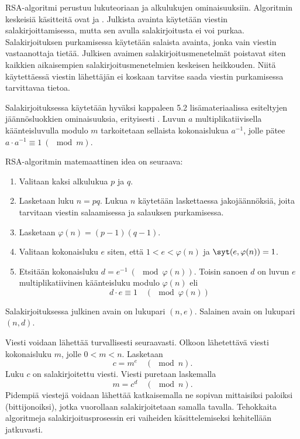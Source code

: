 RSA-algoritmi perustuu lukuteoriaan ja alkulukujen ominaisuuksiin. Algoritmin keskeisiä käsitteitä ovat  ja . Julkista avainta käytetään viestin salakirjoittamisessa, mutta sen avulla salakirjoitusta ei voi purkaa. Salakirjoituksen purkamisessa käytetään salaista avainta, jonka vain viestin vastaanottaja tietää. Julkisen avaimen salakirjoitusmenetelmät poistavat siten kaikkien aikaisempien salakirjoitusmenetelmien keskeisen heikkouden. Niitä käytettäessä viestin lähettäjän ei koskaan tarvitse saada viestin purkamisessa tarvittavaa tietoa. 

Salakirjoituksessa käytetään hyväksi kappaleen 5.2 lisämateriaalissa esiteltyjen jään\-nös\-luok\-kien ominaisuuksia, erityisesti . Luvun $a$ multiplikatiivisella käänteisluvulla modulo $m$ tarkoitetaan sellaista kokonaislukua $a^{-1}$, jolle pätee $a\cdot a^{-1} \equiv 1 \ (\mod m)$.

RSA-algoritmin matemaattinen idea on seuraava:
\begin{enumerate}
\item Valitaan kaksi alkulukua $p$ ja $q$.
\item Lasketaan luku $n=pq$. Lukua $n$ käytetään laskettaessa jakojäännöksiä, joita tarvitaan viestin salaamisessa ja salauksen purkamisessa.
\item Lasketaan $\varphi(n)=(p-1)(q-1)$. 
\item Valitaan kokonaisluku $e$ siten, että $1<e<\varphi(n)$ ja $\syt(e,\varphi(n))=1$.
\item Etsitään kokonaisluku $d = e^{-1}\ (\mod \varphi(n))$. Toisin sanoen $d$ on luvun $e$  multiplikatiivinen käänteisluku modulo $\varphi(n)$ eli
\[
d\cdot e \equiv 1\quad (\mod\varphi(n)) %
\]
\end{enumerate}
Salakirjoituksessa julkinen avain on lukupari $(n,e)$. Salainen avain on lukupari $(n,d)$. 

Viesti voidaan lähettää turvallisesti seuraavasti. Olkoon lähetettävä viesti kokonaisluku $m$, jolle $0<m<n$. Lasketaan
\[
c= m^e\quad (\mod n).
\]
Luku $c$ on salakirjoitettu viesti. Viesti puretaan laskemalla
\[
m=c^d\quad (\mod n).
\]
Pidempiä viestejä voidaan lähettää katkaisemalla ne sopivan mittaisiksi paloiksi (bittijonoiksi), jotka vuorollaan salakirjoitetaan samalla tavalla. Tehokkaita algoritmeja salakirjoitusprosessin eri vaiheiden käsittelemiseksi kehitellään jatkuvasti.

